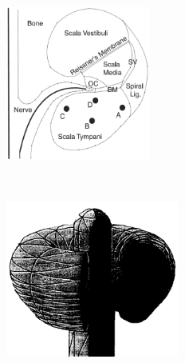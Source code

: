 \begin{figure}
	\centering
    
    \begin{subfigure}[t]{0.45\textwidth}
        \centering
        \includegraphics[height=5.1cm]{Background/frijns_spiral_schematic}
        \caption{ }
        \label{fig:frijns_tissues}
    \end{subfigure}%
    ~~~~
    \begin{subfigure}[t]{0.45\textwidth}
        \centering
        \includegraphics[height=5.1cm]{Background/frijns_rot_mesh}
        \caption{ }
        \label{fig:frijns_rot-1}
    \end{subfigure}%
	\vspace{0.5cm}
	

\end{figure}
